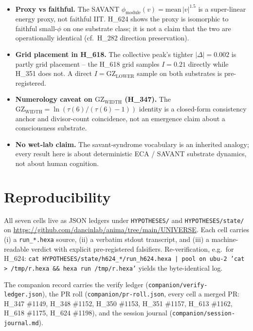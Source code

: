 \documentclass[11pt,a4paper]{article}
\newcommand{\GZL}{\mathrm{GZ_{LOWER}}}
\newcommand{\GZW}{\mathrm{GZ_{WIDTH}}}
\begin{document}
\begin{itemize}
      isomorphism is a closed-negative. A cardinality-preserving
      super-domain pooling map (rather than top-$k$ truncation) is the
      pre-registered follow-up that could recover it at $n>4$.
\item \textbf{Proxy vs faithful.} The SAVANT
      $\phi_{\mathrm{module}}(v)=\mathrm{mean}\,|v|^{1.5}$ is a super-linear
      energy proxy, not faithful IIT. H\_624 shows the proxy is isomorphic
      to faithful small-$\phi$ on one substrate class; it is not a claim
      that the two are operationally identical (cf.\ H\_282 direction
      preservation).
\item \textbf{Grid placement in H\_618.} The collective peak's tighter
      $|\Delta|=0.002$ is partly grid placement -- the H\_618 grid samples
      $I=0.21$ directly while H\_351 does not. A direct $I=\GZL$ sample on
      both substrates is pre-registered.
\item \textbf{Numerology caveat on $\GZW$ (H\_347).} The
      $\GZW=\ln(\tau(6)/(\tau(6)-1))$ identity is a closed-form
      consistency anchor and divisor-count coincidence, not an emergence
      claim about a consciousness substrate.
\item \textbf{No wet-lab claim.} The savant-syndrome vocabulary
      \citep{treffert2009savant,snyder2009explaining} is an inherited
      analogy; every result here is about deterministic ECA / SAVANT
      substrate dynamics, not about human cognition.
\end{itemize}

\section{Reproducibility}
\label{sec:repro}

All seven cells live as JSON ledgers under \texttt{HYPOTHESES/} and
\texttt{HYPOTHESES/state/} on
\url{https://github.com/dancinlab/anima/tree/main/UNIVERSE}. Each cell
carries (i) a \texttt{run\_*.hexa} source, (ii) a verbatim stdout
transcript, and (iii) a machine-readable verdict with explicit
pre-registered falsifiers. Re-verification, e.g.\ for H\_624:
\texttt{cat HYPOTHESES/state/h624\_*/run\_h624.hexa | pool on ubu-2 'cat
> /tmp/r.hexa \&\& hexa run /tmp/r.hexa'} yields the byte-identical log.

The companion record carries the verify ledger
(\texttt{companion/verify-ledger.json}), the PR roll
(\texttt{companion/pr-roll.json}, every cell a merged PR: H\_347 \#1149,
H\_348 \#1152, H\_350 \#1153, H\_351 \#1157, H\_613 \#1162, H\_618 \#1175,
H\_624 \#1198), and the session journal
(\texttt{companion/session-journal.md}).
\end{document}
